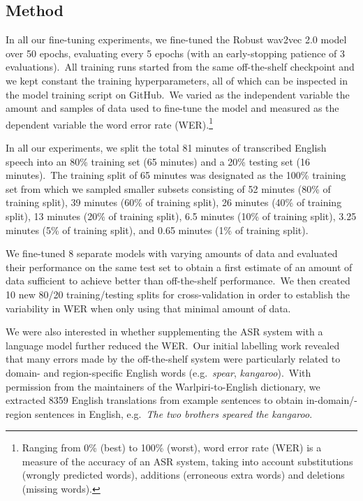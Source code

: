 \documentclass[main.tex]{subfiles}
\begin{document}
\subsection{Method}

In all our fine-tuning experiments, we fine-tuned the Robust wav2vec 2.0 model over 50 epochs, evaluating every 5 epochs (with an early-stopping patience of 3 evaluations).~All training runs started from the same off-the-shelf checkpoint and we kept constant the training hyperparameters, all of which can be inspected in the model training script on GitHub.~We varied as the independent variable the amount and samples of data used to fine-tune the model and measured as the dependent variable the word error rate (WER).\footnote{Ranging from 0\% (best) to 100\% (worst), word error rate (WER) is a measure of the accuracy of an ASR system, taking into account substitutions (wrongly predicted words), additions (erroneous extra words) and deletions (missing words).} 

In all our experiments, we split the total 81 minutes of transcribed English speech into an 80\% training set (65 minutes) and a 20\% testing set (16 minutes).~The training split of 65 minutes was designated as the 100\% training set from which we sampled smaller subsets consisting of 52 minutes (80\% of training split), 39 minutes (60\% of training split), 26 minutes (40\% of training split), 13 minutes (20\% of training split), 6.5 minutes (10\% of training split), 3.25 minutes (5\% of training split), and 0.65 minutes (1\% of training split).

We fine-tuned 8 separate models with varying amounts of data and evaluated their performance on the same test set to obtain a first estimate of an amount of data sufficient to achieve better than off-the-shelf performance.~We then created 10 new 80/20 training/testing splits for cross-validation in order to establish the variability in WER when only using that minimal amount of data.

We were also interested in whether supplementing the ASR system with a language model further reduced the WER.~Our initial labelling work revealed that many errors made by the off-the-shelf system were particularly related to domain- and region-specific English words (e.g.~\textit{spear}, \textit{kangaroo}).~With permission from the maintainers of the Warlpiri-to-English dictionary, we extracted 8359 English translations from example sentences to obtain in-domain/-region sentences in English, e.g.~\textit{The two brothers speared the kangaroo}.
\end{document}

